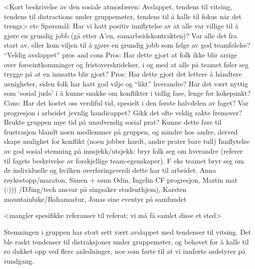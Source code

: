 <Kort beskrivelse av den sosiale atmosfæren: Avslappet, tendens til vitsing, tendens til distractions under gruppemøter, tendens til å kalle til fokus når det trengs>
etc
Spørsmål:
Har vi hatt positiv innflytelse av at alle var villige til å gjøre en grundig jobb (gå etter A’en, samarbeidskontrakten)?
Var alle det fra start av, eller kom viljen til å gjøre en grundig jobb som følge av god teamfølelse?
“Veldig avslappet” pros and cons
Pros: Har dette gjort at folk ikke blir arrige over forseintkomminger og fristoverskridelser, i og med at alle på teamet føler seg trygge på at en innsatts blir gjort? 
Pros: Har dette gjort det lettere å håndtere uenigheter, siden folk har hatt god vilje og “likt” hverandre?
Har det vært nyttig som ‘sosial judo’ i å kunne snakke om konflikter i tidlig fase, lenge før kokepunkt?
Cons: Har det kostet oss verdiful tid, spesielt i den første halvdelen av faget? Var progresjon i arbeidet jevnlig handicappet? Gikk det ofte veldig sakte fremover? Brukte gruppen mye tid på unødvendig sosial prat? Kunne dette føre til frustrasjon blandt noen medlemmer på gruppen, og mindre hos andre, derved skape mulighet for konflikt (noen jobber hardt, andre prater bare tull)
Innflytelse av god sosial stemning på innsjekk/utsjekk: bryr folk seg om hverandre (referer til fagets beskrivelse av forskjellige team-egenskaper). F eks teamet bryr seg om de individuelle og hvilken overføringsverdi dette har til arbeidet.
 Anna røykestopp/maraton, Simen + sønn Odin, Ingelin CF progresjon, Martin mat (:))) /DJing/tech ansvar på singsaker studenthjem), Karsten mountainbike/Bahamastur, Jonas sine eventyr på samfundet 

<mangler spesifikke referanser til referat; vi må få samlet disse et sted>

\fi

Stemningen i gruppen har stort sett vært avslappet med tendenser til vitsing.
Det ble raskt tendenser til distraksjoner under gruppemøter, og behovet for å kalle til ro dukket opp ved flere anledninger, noe som førte til at vi innførte ordstyrer på rundgang.
